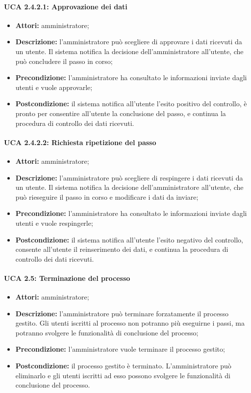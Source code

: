 \paragraph{UCA 2.4.2.1: Approvazione dei dati}
\begin{itemize}
\item \textbf{Attori:} 
amministratore;
\item \textbf{Descrizione:} 
l'amministratore può scegliere di approvare i dati ricevuti da un utente. Il sistema notifica la decisione dell'amministratore all'utente, che può concludere il passo in corso;
\item \textbf{Precondizione:} 
l'amministratore ha consultato le informazioni inviate dagli utenti e vuole approvarle;
\item \textbf{Postcondizione:} 
il sistema notifica all'utente l'esito positivo del controllo, è pronto per consentire all'utente la conclusione del passo, e continua la procedura di controllo dei dati ricevuti.
\end{itemize}

\paragraph{UCA 2.4.2.2: Richiesta ripetizione del passo}
\begin{itemize}
\item \textbf{Attori:} 
amministratore;
\item \textbf{Descrizione:} 
l'amministratore può scegliere di respingere i dati ricevuti da un utente. Il sistema notifica la decisione dell'amministratore all'utente, che può rieseguire il passo in corso e modificare i dati da inviare;
\item \textbf{Precondizione:} 
l'amministratore ha consultato le informazioni inviate dagli utenti e vuole respingerle;
\item \textbf{Postcondizione:} 
il sistema notifica all'utente l'esito negativo del controllo, consente all'utente il reinserimento dei dati, e continua la procedura di controllo dei dati ricevuti.
\end{itemize}

\paragraph{UCA 2.5: Terminazione del processo}
\begin{itemize}
\item \textbf{Attori:} amministratore;
\item \textbf{Descrizione:} 
l'amministratore può terminare forzatamente il processo gestito. Gli utenti iscritti al processo non potranno più eseguirne i passi, ma potranno svolgere le funzionalità di conclusione del processo; 
\item \textbf{Precondizione:} 
l'amministratore vuole terminare il processo gestito;
\item \textbf{Postcondizione:} 
il processo gestito è terminato. L'amministratore può eliminarlo e gli utenti iscritti ad esso possono svolgere le funzionalità di conclusione del processo.
\end{itemize}

